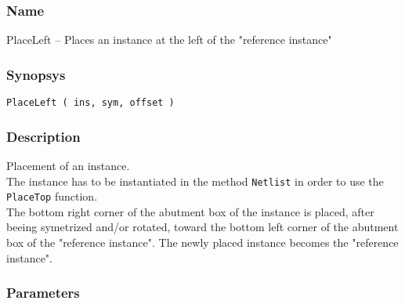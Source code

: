 \subsubsection{Name}

PlaceLeft -- Places an instance at the left of the "reference instance"

\subsubsection{Synopsys}

\begin{verbatim}
PlaceLeft ( ins, sym, offset )
\end{verbatim}

\subsubsection{Description}

Placement of an instance.\\
\indent The instance has to be instantiated in the method \verb-Netlist- in order to use the \verb-PlaceTop- function.\\
    
\indent The bottom right corner of the abutment box of the instance is placed, after beeing symetrized and/or rotated, toward the bottom left corner of the abutment box of the "reference instance". The newly placed instance becomes the "reference instance".

\subsubsection{Parameters}

